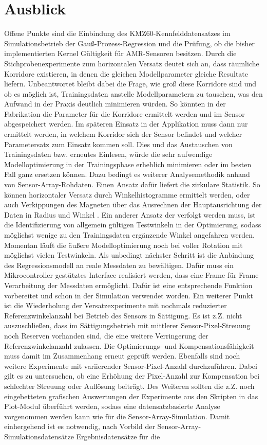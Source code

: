 \section{Ausblick}\label{sec:ausblick}


Offene Punkte sind die Einbindung des KMZ60-Kennfelddatensatzes im Simulationsbetrieb der Gauß-Prozess-Regression und die Prüfung, ob die bisher implementierten Kernel Gültigkeit für AMR-Sensoren besitzen. Durch die Stichprobenexperimente zum horizontalen Versatz deutet sich an, dass räumliche Korridore existieren, in denen die gleichen Modellparameter gleiche Resultate liefern. Unbeantwortet bleibt dabei die Frage, wie groß diese Korridore sind und ob es möglich ist, Trainingsdaten anstelle Modellparametern zu tauschen, was den Aufwand in der Praxis deutlich minimieren würden. So könnten in der Fabrikation die Parameter für die Korridore ermittelt werden und im Sensor abgespeichert werden. Im späteren Einsatz in der Applikation muss dann nur ermittelt werden, in welchem Korridor sich der Sensor befindet und welcher Parametersatz zum Einsatz kommen soll. Dies und das Austauschen von Trainingsdaten bzw. erneutes Einlesen, würde die sehr aufwendige Modelloptimierung in der Trainingsphase erheblich minimieren oder im besten Fall ganz ersetzen können. Dazu bedingt es weiterer Analysemethodik anhand von Sensor-Array-Rohdaten. Einen Ansatz dafür liefert die zirkulare Statistik. So können horizontaler Versatz durch Winkelhistogramme ermittelt werden, oder auch Verkippungen des Magneten über das Ausrechnen der Hauptausrichtung der Daten in Radius und Winkel \cite{Fisher1993}\cite{Mardia1999}. Ein anderer Ansatz der verfolgt werden muss, ist die Identifizierung von allgemein gültigen Testwinkeln in der Optimierung, sodass möglichst wenige zu den Trainingsdaten ergänzende Winkel angefahren werden. Momentan läuft die äußere Modelloptimierung noch bei voller Rotation mit möglichst vielen Testwinkeln. Als unbedingt nächster Schritt ist die Anbindung des Regressionsmodell an reale Messdaten zu bewältigen. Dafür muss ein Mikrocontroller gestütztes Interface realisiert werden, dass eine Frame für Frame Verarbeitung der Messdaten ermöglicht. Dafür ist eine entsprechende Funktion vorbereitet und schon in der Simulation verwendet worden. Ein weiterer Punkt ist die Wiederholung der Versatzexperimente mit nochmals reduzierter Referenzwinkelanzahl bei Betrieb des Sensors in Sättigung. Es ist z.Z. nicht auszuschließen, dass im Sättigungsbetrieb mit mittlerer Sensor-Pixel-Streuung noch Reserven vorhanden sind, die eine weitere Verringerung der Referenzwinkelanzahl zulassen. Die Optimierungs- und Kompensationsfähigkeit muss damit im Zusammenhang erneut geprüft werden. Ebenfalls sind noch weitere Experimente mit variierender Sensor-Pixel-Anzahl durchzuführen. Dabei gilt es zu untersuchen, ob eine Erhöhung der Pixel-Anzahl zur Kompensation bei schlechter Streuung oder Auflösung beiträgt. Des Weiteren sollten die z.Z. noch eingebetteten grafischen Auswertungen der Experimente aus den Skripten in das Plot-Modul überführt werden, sodass eine datensatzbasierte Analyse vorgenommen werden kann wie für die Sensor-Array-Simulation. Damit einhergehend ist es notwendig, nach Vorbild der Sensor-Array-Simulationsdatensätze Ergebnisdatensätze für die 